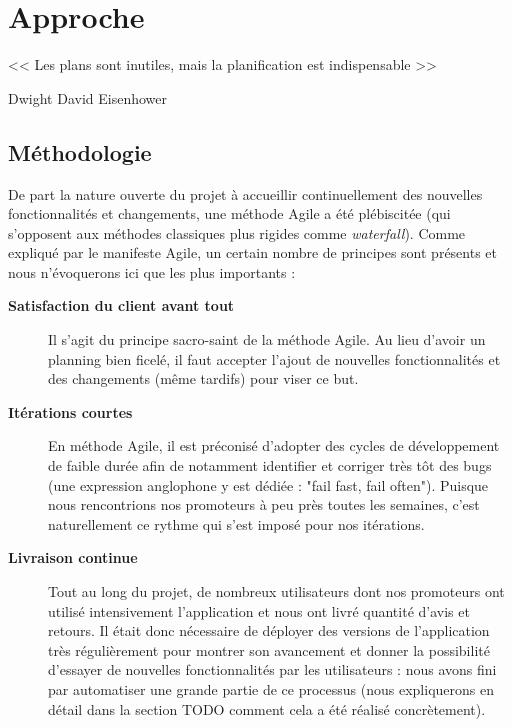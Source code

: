 \chapter{Approche}

\epigraph{<< Les plans sont inutiles, mais la planification est indispensable >>}{Dwight David Eisenhower}

\section{Méthodologie}

De part la nature ouverte du projet à accueillir continuellement des nouvelles fonctionnalités et changements, une méthode Agile a été plébiscitée (qui s'opposent aux méthodes classiques plus rigides comme \textit{waterfall}). Comme expliqué par le manifeste Agile\cite{agileManifeste}, un certain nombre de principes sont présents et nous n'évoquerons ici que les plus importants : 

\begin{description}
    \item[\textbf{Satisfaction du client avant tout}] Il s'agit du principe sacro-saint de la méthode Agile\cite{agileManifeste}. Au lieu d'avoir un planning bien ficelé, il faut accepter l'ajout de nouvelles fonctionnalités et des changements (même tardifs) pour viser ce but.
    
    \item[\textbf{Itérations courtes}] En méthode Agile\cite{agileManifeste}, il est préconisé d'adopter des cycles de développement de faible durée afin de notamment identifier et corriger très tôt des bugs (une expression anglophone y est dédiée : "fail fast, fail often"). Puisque nous rencontrions nos promoteurs à peu près toutes les semaines, c'est naturellement ce rythme qui s'est imposé pour nos itérations.
    
    \item[\textbf{Livraison continue}] Tout au long du projet, de nombreux utilisateurs dont nos promoteurs ont utilisé intensivement l'application et nous ont livré quantité d'avis et retours. Il était donc nécessaire de déployer des versions de l'application très régulièrement pour montrer son avancement et donner la possibilité d'essayer de nouvelles fonctionnalités par les utilisateurs : nous avons fini par automatiser une grande partie de ce processus (nous expliquerons en détail dans la section TODO comment cela a été réalisé concrètement).
\end{description}

